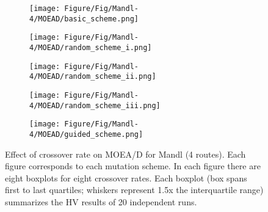 \begin{figure}[!htbp]
	\centering
	\begin{subfigure}[b]{0.52\textwidth}
		\texttt{[image: Figure/Fig/Mandl-4/MOEAD/basic\_scheme.png]}
	\end{subfigure}%
	\begin{subfigure}[b]{0.52\textwidth}
		\texttt{[image: Figure/Fig/Mandl-4/MOEAD/random\_scheme\_i.png]}
	\end{subfigure}%
	\newline
	\begin{subfigure}[b]{0.52\textwidth}
		\texttt{[image: Figure/Fig/Mandl-4/MOEAD/random\_scheme\_ii.png]}
	\end{subfigure}%
	\begin{subfigure}[b]{0.52\textwidth}
		\texttt{[image: Figure/Fig/Mandl-4/MOEAD/random\_scheme\_iii.png]}
	\end{subfigure}%
	\newline
	\begin{subfigure}[b]{0.52\textwidth}
		\texttt{[image: Figure/Fig/Mandl-4/MOEAD/guided\_scheme.png]}
	\end{subfigure}%
	\caption{Effect of crossover rate on MOEA/D for Mandl (4 routes). Each figure corresponds to each mutation scheme. In each figure there are eight boxplots for eight crossover rates.  Each boxplot (box spans first to last quartiles; whiskers represent 1.5x the interquartile range) summarizes the HV results of 20 independent runs.}
	\label{fig:cr_mandl4_moead}
\end{figure}
